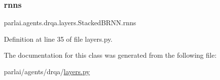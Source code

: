 \subsubsection{\texorpdfstring{rnns}{rnns}}
{\footnotesize\ttfamily parlai.\+agents.\+drqa.\+layers.\+Stacked\+B\+R\+N\+N.\+rnns}



Definition at line 35 of file layers.\+py.



The documentation for this class was generated from the following file\+:\begin{DoxyCompactItemize}
\item 
parlai/agents/drqa/\hyperlink{layers_8py}{layers.\+py}\end{DoxyCompactItemize}
